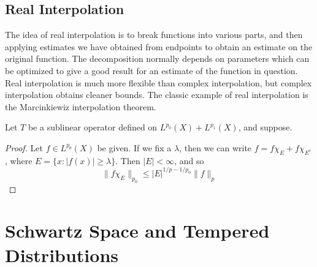 \section{Real Interpolation}

The idea of real interpolation is to break functions into various parts, and then applying estimates we have obtained from endpoints to obtain an estimate on the original function. The decomposition normally depends on parameters which can be optimized to give a good result for an estimate of the function in question. Real interpolation is much more flexible than complex interpolation, but complex interpolation obtains cleaner bounds. The classic example of real interpolation is the Marcinkiewiz interpolation theorem.

\begin{theorem}
    Let $T$ be a sublinear operator defined on $L^{p_0}(X) + L^{p_1}(X)$, and suppose.
\end{theorem}
\begin{proof}
    Let $f \in L^{p_\theta}(X)$ be given. If we fix a $\lambda$, then we can write $f = f \chi_E + f \chi_{E^c}$, where $E = \{ x: |f(x)| \geq \lambda \}$. Then $|E| < \infty$, and so
    \[ \| f \chi_E \|_{p_0} \leq |E|^{1/p-1/p_0} \| f \|_p \]
\end{proof}











\chapter{Schwartz Space and Tempered Distributions}

